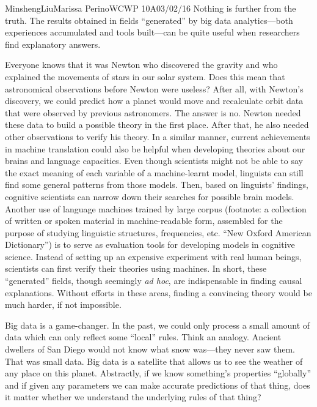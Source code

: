 \documentclass[12pt,letterpaper]{article}
\begin{document}
\begin{mla}{Minsheng}{Liu}{Marissa Perino}{WCWP 10A}{03/02/16}
Nothing is further from the truth. The results obtained in fields
``generated'' by big data analytics---both experiences accumulated and
tools built---can be quite useful when researchers find explanatory
answers.

Everyone knows that it was Newton who discovered the gravity and who
explained the movements of stars in our solar system. Does this mean
that astronomical observations before Newton were useless? After all,
with Newton's discovery, we could predict how a planet would move and
recalculate orbit data that were observed by previous astronomers. The
answer is no. Newton needed these data to build a possible theory in the
first place. After that, he also needed other observations to verify his
theory. In a similar manner, current achievements in machine translation
could also be helpful when developing theories about our brains and
language capacities. Even though scientists might not be able to say the
exact meaning of each variable of a machine-learnt model, linguists can
still find some general patterns from those models. Then, based on
linguists' findings, cognitive scientists can narrow down their searches
for possible brain models. Another use of language machines trained by
large corpus (footnote: a collection of written or spoken material in
machine-readable form, assembled for the purpose of studying linguistic
structures, frequencies, etc. ``New Oxford American Dictionary'') is to
serve as evaluation tools for developing models in cognitive science.
Instead of setting up an expensive experiment with real human beings,
scientists can first verify their theories using machines. In short,
these ``generated'' fields, though seemingly \emph{ad hoc}, are
indispensable in finding causal explanations. Without efforts in these
areas, finding a convincing theory would be much harder, if not
impossible.

Big data is a game-changer. In the past, we could only process a small
amount of data which can only reflect some ``local'' rules. Think an
analogy. Ancient dwellers of San Diego would not know what snow
was---they never saw them. That was small data. Big data is a satellite
that allows us to see the weather of any place on this planet.
Abstractly, if we know something's properties ``globally'' and if given
any parameters we can make accurate predictions of that thing, does it
matter whether we understand the underlying rules of that thing?


\end{mla}
\end{document}
